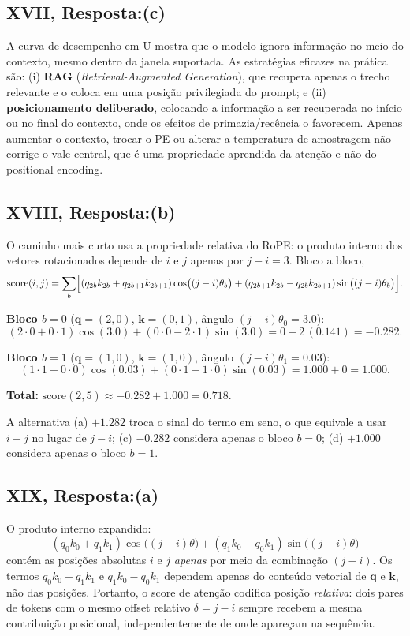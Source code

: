 \documentclass{dlproblemset}
\begin{document}
\subsection*{XVII, Resposta:(c)}
A curva de desempenho em U mostra que o modelo ignora informação no meio do contexto,
mesmo dentro da janela suportada. As estratégias eficazes na prática são:
(i) \textbf{RAG} (\textit{Retrieval-Augmented Generation}), que recupera apenas o
trecho relevante e o coloca em uma posição privilegiada do prompt; e
(ii) \textbf{posicionamento deliberado}, colocando a informação a ser recuperada no início ou no
final do contexto, onde os efeitos de primazia/recência o favorecem. Apenas aumentar
o contexto, trocar o PE ou alterar a temperatura de amostragem não corrige o vale
central, que é uma propriedade aprendida da atenção e não do positional encoding.

\subsection*{XVIII, Resposta:(b)}

O caminho mais curto usa a propriedade relativa do RoPE: o produto interno dos vetores
rotacionados depende de $i$ e $j$ apenas por $j - i = 3$. Bloco a bloco,
\[
  \mathrm{score}(i,j) = \sum_{b}\Bigl[(q_{2b}k_{2b} + q_{2b+1}k_{2b+1})\cos\bigl((j-i)\theta_b\bigr)
  + (q_{2b+1}k_{2b} - q_{2b}k_{2b+1})\sin\bigl((j-i)\theta_b\bigr)\Bigr].
\]

\textbf{Bloco $b=0$} ($\mathbf{q} = (2,0)$, $\mathbf{k} = (0,1)$, ângulo $(j-i)\theta_0 = 3.0$):
\[
  (2\cdot0 + 0\cdot1)\cos(3.0) + (0\cdot0 - 2\cdot1)\sin(3.0)
  = 0 - 2\,(0.141) = -0.282.
\]

\textbf{Bloco $b=1$} ($\mathbf{q} = (1,0)$, $\mathbf{k} = (1,0)$, ângulo $(j-i)\theta_1 = 0.03$):
\[
  (1\cdot1 + 0\cdot0)\cos(0.03) + (0\cdot1 - 1\cdot0)\sin(0.03)
  = 1.000 + 0 = 1.000.
\]

\textbf{Total:} $\mathrm{score}(2,5) \approx -0.282 + 1.000 = 0.718$.

A alternativa (a) $+1.282$ troca o sinal do termo em seno, o que equivale a usar
$i - j$ no lugar de $j - i$; (c) $-0.282$ considera apenas o bloco $b=0$; (d) $+1.000$
considera apenas o bloco $b=1$.

\subsection*{XIX, Resposta:(a)}
O produto interno expandido:
\[
  (q_0 k_0 + q_1 k_1)\cos\!\bigl((j-i)\theta\bigr)
  + (q_1 k_0 - q_0 k_1)\sin\!\bigl((j-i)\theta\bigr)
\]
contém as posições absolutas $i$ e $j$ \emph{apenas} por meio da combinação
$(j - i)$. Os termos $q_0 k_0 + q_1 k_1$ e $q_1 k_0 - q_0 k_1$ dependem apenas
do conteúdo vetorial de $\mathbf{q}$ e $\mathbf{k}$, não das posições.
Portanto, o score de atenção codifica posição \emph{relativa}: dois pares de tokens
com o mesmo offset relativo $\delta = j - i$ sempre recebem a mesma contribuição
posicional, independentemente de onde apareçam na sequência.
\end{document}
